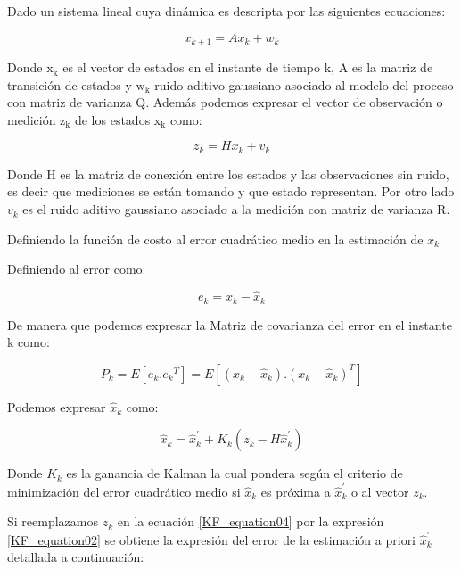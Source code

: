\documentclass[10pt,a4paper]{article}
\begin{document}
Dado un sistema lineal cuya dinámica es descripta por las siguientes ecuaciones:

\begin{equation}
    x_{k+1}= Ax_{k} + w_{k}
    \label{KF_equation01}
\end{equation}	

\noindent Donde $\mathrm{x_{k}}$ es el vector de estados en el instante de 
tiempo k, A es la matriz de transición de estados y $\mathrm{w_{k}}$ ruido 
aditivo gaussiano asociado al modelo del proceso con matriz de varianza Q. 
Además podemos expresar el vector de observación o medición $\mathrm{z_{k}}$ 
de los estados $\mathrm{x_{k}}$ como:

\begin{equation}
    z_{k}= Hx_{k} + v_{k}
    \label{KF_equation02}
\end{equation}	

Donde H es la matriz de conexión entre los estados y las observaciones sin
ruido, es decir que mediciones se están tomando y que estado representan. Por
otro lado $v_{k}$ es el ruido aditivo gaussiano asociado a la medición con
matriz de varianza R.

Definiendo la función de costo al error cuadrático medio en la estimación de
$x_k$ 

Definiendo al error como: 

\begin{equation}
    e_{k} = x_k  - \hat{x}_k
    \label{KF_error}
\end{equation}	

De manera que podemos expresar la Matriz de covarianza del error en el instante
k como:

\begin{equation}
    P_{k} = E[e_k.{e_k}^{T}] = E[(x_k-\hat{x}_k).(x_k-\hat{x}_k)^{T}]
    \label{KF_equation03}
\end{equation}	

Podemos expresar $\hat{x}_k$ como: 

\begin{equation}
    \hat{x}_k = \hat{x}^\prime_k + K_k (z_k - H\hat{x}^\prime_k)
    \label{KF_equation04}
\end{equation}	

Donde $K_k$ es la ganancia de Kalman la cual pondera según el criterio de
minimización del error cuadrático medio si $\hat{x}_k$ es próxima a
$\hat{x}^\prime_k$ o al vector $z_k$.

Si reemplazamos $z_k$ en la ecuación \ref{KF_equation04} por la expresión
\ref{KF_equation02} se obtiene la expresión del error de la estimación a priori
$\hat{x}^\prime_k$ detallada a continuación:
\end{document}

